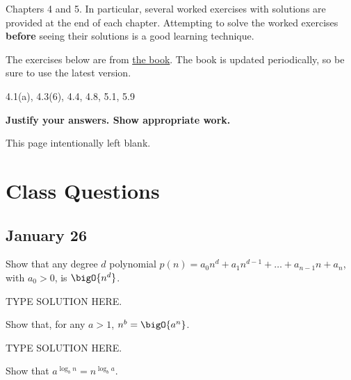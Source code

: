 \documentclass[draft]{article}
\begin{document}
\begin{titlepage}
    \begin{tcolorbox}[title=Reading,fonttitle=\bfseries]
        Chapters 4 and 5. In particular, several worked exercises with solutions are provided at the end of each chapter. Attempting to solve the worked exercises \textbf{before} seeing their solutions is a good learning technique.
    \end{tcolorbox}
    The exercises below are from \href{https://sites.google.com/site/gopalpandurangan/home/algorithms-course}{the book}. The book is updated periodically, so be sure to use the latest version.

    \begin{tcolorbox}[title=Exercises,fonttitle=\bfseries]
        4.1(a), 4.3(6), 4.4, 4.8, 5.1, 5.9
    \end{tcolorbox}

    \textbf{Justify your answers. Show appropriate work.}
\end{titlepage}
\vspace*{\fill}\begin{center}{\Huge This page intentionally left blank.}\end{center}\vspace*{\fill}\thispagestyle{empty}\clearpage
{}

\section{Class Questions}
\subsection{January 26}

\begin{question}
    Show that any degree $d$ polynomial $p(n) = a_0n^d + a_1n^{d - 1} + \dots + a_{n-1}n + a_n$, with $a_0 > 0$, is $\bigO{n^d}$.
\end{question}

\begin{solution}
    TYPE SOLUTION HERE.
\end{solution}

\begin{question}
    Show that, for any $a > 1$, $n^b = \bigO{a^n}$.
\end{question}

\begin{solution}
    TYPE SOLUTION HERE.
\end{solution}

\begin{question}
    Show that $a^{\log_b{n}} = n^{\log_b{a}}$.
\end{question}
\end{document}
